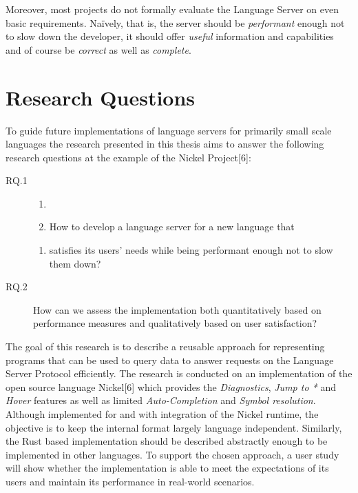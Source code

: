 \documentclass[
  a4paper,
  bibtex,
  english,
  nomenclature]{kthlatex/kththesis/kththesis}
\providecommand{\tightlist}{%
  \setlength{\itemsep}{0pt}\setlength{\parskip}{0pt}}
\begin{document}
Moreover, most projects do not formally evaluate the Language Server on
even basic requirements. Naïvely, that is, the server should be
\emph{performant} enough not to slow down the developer, it should offer
\emph{useful} information and capabilities and of course be
\emph{correct} as well as \emph{complete}.

\hypertarget{sec:research-questions}{%
\section{Research Questions}\label{sec:research-questions}}

To guide future implementations of language servers for primarily small
scale languages the research presented in this thesis aims to answer the
following research questions at the example of the Nickel
Project{[}6{]}:

\begin{description}
\item[RQ.1]
\begin{enumerate}
\def\labelenumi{\alph{enumi})}
\tightlist
\item[]
\item
  How to develop a language server for a new language that
\end{enumerate}

\begin{enumerate}
\def\labelenumi{\alph{enumi})}
\setcounter{enumi}{1}
\tightlist
\item
  satisfies its users' needs while being performant enough not to slow
  them down?
\end{enumerate}
\item[RQ.2]
How can we assess the implementation both quantitatively based on
performance measures and qualitatively based on user satisfaction?
\end{description}

The goal of this research is to describe a reusable approach for
representing programs that can be used to query data to answer requests
on the Language Server Protocol efficiently. The research is conducted
on an implementation of the open source language Nickel{[}6{]} which
provides the \emph{Diagnostics}, \emph{Jump to *} and \emph{Hover}
features as well as limited \emph{Auto-Completion} and \emph{Symbol
resolution}. Although implemented for and with integration of the Nickel
runtime, the objective is to keep the internal format largely language
independent. Similarly, the Rust based implementation should be
described abstractly enough to be implemented in other languages. To
support the chosen approach, a user study will show whether the
implementation is able to meet the expectations of its users and
maintain its performance in real-world scenarios.
\end{document}
